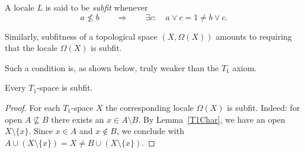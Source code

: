 \begin{df}[Sfit]
  A locale $L$ is said to be {\sl subfit\/} whenever
  \[
    a \not\le b \qquad \Rightarrow \qquad \exists c: \quad a \vee c = 1 \ne b
    \vee c.
  \]
\end{df}

Similarly, subfitness of a topological space $(X, \Omega(X))$ amounts to
requiring that the locale $\Omega(X)$ is subfit.

Such a condition is, as shown below, truly weaker than the $T_1$ axiom.

\begin{prop}
  Every $T_1$-space is subfit.
\end{prop}

\begin{proof}
  For each $T_1$-space $X$ the corresponding locale $\Omega(X)$ is subfit.
  Indeed: for open $A\not\subseteq B$ there exists an $x\in A \setminus B$.
  By Lemma~\ref{T1Char}\thinspace, we have an open $X\setminus \{x\}$.
  Since $x\in A$ and $x\not\in B$, we conclude with $A\cup (X\setminus \{x\}) =
  X \ne B \cup (X\setminus \{x\})$.
\end{proof}
